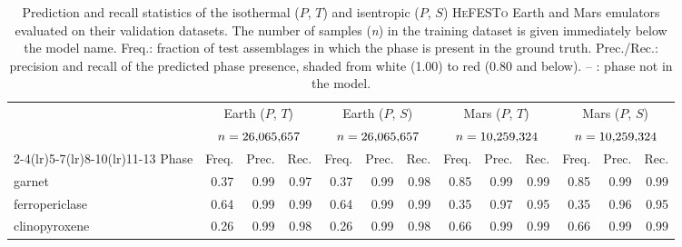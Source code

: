 \begin{table}[!htbp]
\centering
\footnotesize
\setlength{\tabcolsep}{2.2pt}
\setlength{\aboverulesep}{0pt}
\setlength{\belowrulesep}{0pt}
\renewcommand{\arraystretch}{1.15}
\caption{Prediction and recall statistics of the isothermal ($P$, $T$) and isentropic ($P$, $S$) \textsc{HeFESTo} Earth and Mars emulators evaluated on 
their validation datasets. The number of samples (\emph{n}) in the training dataset is given immediately below the model name. Freq.: fraction of test assemblages 
in which the phase is present in the ground truth. Prec./Rec.: precision and recall of the predicted phase presence, shaded from white (1.00) to red (0.80 and below). 
-- : phase not in the model.}
\label{tab:ch4-quality-hefesto}

\begin{tabular}{@{}l|rrr|rrr|rrr|rrr@{}}
\toprule
 & \multicolumn{3}{|c}{Earth ($P$, $T$)} & \multicolumn{3}{|c}{Earth ($P$, $S$)} & \multicolumn{3}{|c}{Mars ($P$, $T$)} & \multicolumn{3}{|c}{Mars ($P$, $S$)} \\
 & \multicolumn{3}{|c}{$n = 26{,}065{,}657$} & \multicolumn{3}{|c}{$n = 26{,}065{,}657$} & \multicolumn{3}{|c}{$n = 10{,}259{,}324$} & \multicolumn{3}{|c}{$n = 10{,}259{,}324$} \\
\cmidrule(lr){2-4}\cmidrule(lr){5-7}\cmidrule(lr){8-10}\cmidrule(lr){11-13}
Phase & Freq. & Prec. & Rec. & Freq. & Prec. & Rec. & Freq. & Prec. & Rec. & Freq. & Prec. & Rec. \\
\midrule
garnet & 0.37 & \cellcolor[RGB]{254,248,247}0.99 & \cellcolor[RGB]{252,238,237}0.97 & 0.37 & \cellcolor[RGB]{254,247,246}0.99 & \cellcolor[RGB]{253,242,241}0.98 & 0.85 & \cellcolor[RGB]{254,247,247}0.99 & \cellcolor[RGB]{254,248,248}0.99 & 0.85 & \cellcolor[RGB]{254,250,249}0.99 & \cellcolor[RGB]{253,246,245}0.99 \\
ferropericlase & 0.64 & \cellcolor[RGB]{254,250,250}0.99 & \cellcolor[RGB]{253,246,246}0.99 & 0.64 & \cellcolor[RGB]{254,251,251}0.99 & \cellcolor[RGB]{253,246,246}0.99 & 0.35 & \cellcolor[RGB]{251,232,231}0.97 & \cellcolor[RGB]{249,219,217}0.95 & 0.35 & \cellcolor[RGB]{251,230,229}0.96 & \cellcolor[RGB]{249,221,219}0.95 \\
clinopyroxene & 0.26 & \cellcolor[RGB]{254,250,250}0.99 & \cellcolor[RGB]{253,243,242}0.98 & 0.26 & \cellcolor[RGB]{254,249,249}0.99 & \cellcolor[RGB]{253,244,244}0.98 & 0.66 & \cellcolor[RGB]{254,247,246}0.99 & \cellcolor[RGB]{254,247,246}0.99 & 0.66 & \cellcolor[RGB]{254,250,250}0.99 & \cellcolor[RGB]{253,245,244}0.99 \\

\end{tabular}
\end{table}
